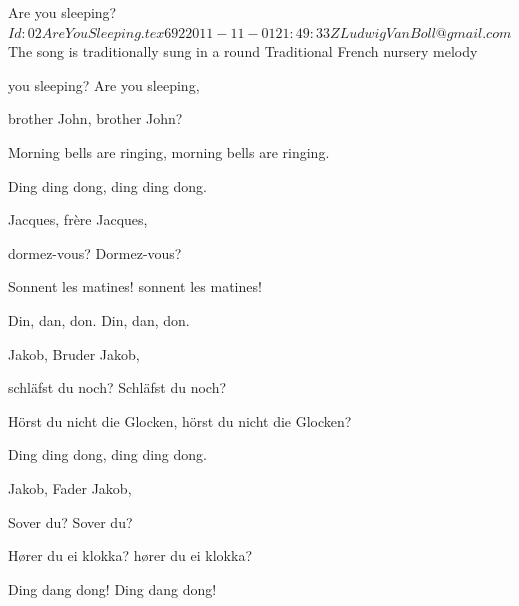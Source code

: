 \begin{SBSong}{Are you sleeping?}
    {$Id: 02AreYouSleeping.tex 692 2011-11-01 21:49:33Z LudwigVanBoll@gmail.com $}
    {The song is traditionally sung in a round}
    {Traditional French nursery melody}
  \begin{SBVerse}
     you sleeping? Are you sleeping, 

    brother John, brother John?

    Morning bells are ringing, morning bells are ringing. 

    Ding ding dong, ding ding dong.
  \end{SBVerse}
  \begin{SBVerse}
     Jacques, fr\`{e}re Jacques, 
    
    dormez-vous? Dormez-vous?

    Sonnent les matines! sonnent les matines!

    Din, dan, don. Din, dan, don.
  \end{SBVerse}
  \begin{SBVerse}
     Jakob, Bruder Jakob,  

    schl\"{a}fst du noch? Schl\"{a}fst du noch?
    
    H\"{o}rst du nicht die Glocken, h\"{o}rst du nicht die Glocken? 

    Ding ding dong, ding ding dong.
  \end{SBVerse}
  \begin{SBVerse}
     Jakob, Fader Jakob,  
  
    Sover du? Sover du?
    
    H\o rer du ei klokka? h\o rer du ei klokka?
    
    Ding dang dong! Ding dang dong!
  \end{SBVerse}
\end{SBSong}

